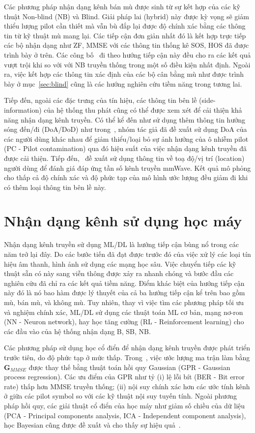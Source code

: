 Các phương pháp nhận dạng kênh bán mù được sinh từ sự kết hợp của các kỹ thuật Non-blind (NB) và Blind. Giải pháp lai (hybrid) này được kỳ vọng sẽ giảm thiểu lượng pilot cần thiết mà vẫn bù đắp lại được độ chính xác bằng các thông tin từ kỹ thuật mù mang lại. Các tiếp cận đơn giản nhất đó là kết hợp trực tiếp các bộ nhận dạng như ZF, MMSE với các thông tin thống kê SOS, HOS đã được trình bày ở trên. Các công bố~\cite{Wan2008, Ladaycia2019, Rekik2021} đi theo hướng tiếp cận này đều cho ra các kết quả vượt trội khi so với với NB truyền thống trong một số điều kiện nhất định. Ngoài ra, việc kết hợp các thông tin xác định của các bộ cân bằng mù như được trình bày ở mục~\ref{sec:blind} cũng là các hướng nghiên cứu tiềm năng trong tương lai.

Tiếp đến, ngoài các đặc trưng của tín hiệu, các thông tin bên lề (side-information) của hệ thống thu phát cũng có thể được xem xét để cải thiện khả năng nhận dạng kênh truyền. Có thể kể đến như sử dụng thêm thông tin hướng sóng đến/đi (DoA/DoD) như trong~\cite{Wang2016}, nhóm tác giả đã đề xuất sử dụng DoA của các người dùng khác nhau để giảm thiểu/loại bỏ sự ảnh hưởng của ô nhiễm pilot (PC - Pilot contamination) qua đó hiệu suất của việc nhận dạng kênh truyền đã được cải thiện. Tiếp đến,~\cite{Lin2020} đề xuất sử dụng thông tin về toạ độ/vị trí (location) người dùng để đánh giá đáp ứng tần số kênh truyền mmWave. Kết quả mô phỏng cho thấp cả độ chính xác và độ phức tạp của mô hình ước lượng đều giảm đi khi có thêm loại thông tin bên lề này.

\section{Nhận dạng kênh sử dụng học máy}

Nhận dạng kênh truyền sử dụng ML/DL là hướng tiếp cận bùng nổ trong các năm trở lại đây. Do các bước tiến đã đạt được trước đó của việc xử lý các loại tín hiệu âm thanh, hình ảnh sử dụng các mạng học sâu. Việc chuyển tiếp các kỹ thuật sẵn có này sang viễn thông được xảy ra nhanh chóng và bước đầu các nghiên cứu đã chỉ ra các kết quả tiềm năng. Điểm khác biệt của hướng tiếp cận này đó là nó bao hàm được lý thuyết của cả ba hướng tiếp cận kể trên bao gồm mù, bán mù, và không mù. Tuy nhiên, thay vì việc tìm các phương pháp tối ưu và nghiệm chính xác, ML/DL sử dụng các thuật toán ML cơ bản, mạng nơ-ron (NN - Neuron network), hay học tăng cường (RL - Reinforcement learning) cho các đầu vào của hệ thống nhận dạng B, SB, NB.

Các phương pháp sử dụng học cổ điển để nhận dạng kênh truyền được phát triển trước tiên, do độ phức tạp ở mức thấp. Trong~\cite{Simeon2022}, việc ước lượng ma trận làm bằng $\mathbf{G}_{MMSE}$ được thay thế bằng thuật toán hồi quy Gaussian (GPR - Gaussian process regression). Các ưu điểm của GPR như tỷ (i) lệ lỗi bít (BER - Bit error rate) thấp hơn MMSE truyền thống; (ii) nội suy chính xác hơn các ước tính kênh ở giữa các pilot symbol so với các kỹ thuật nội suy tuyến tính. Ngoài phương pháp hồi quy, các giải thuật cổ điển của học máy như giảm số chiều của dữ liệu (PCA - Principal components analysis, ICA - Independent component analysis), học Bayesian cũng được đề xuất và cho thấy sự hiệu quả~\cite{vilas2022}.

